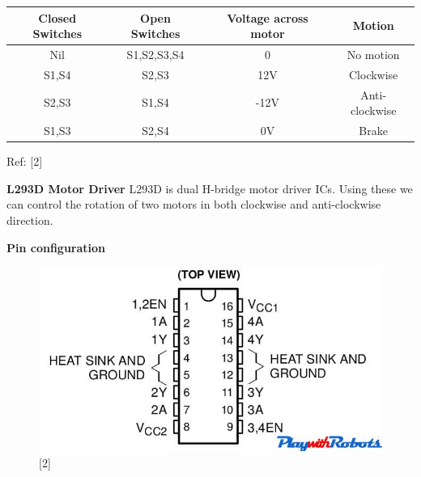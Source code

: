 \documentclass[11pt,a4paper]{article}
\begin{document}
    \begin{tabular}{|c|c|c|c|}
    	\hline
	    Closed Switches & Open Switches & Voltage across motor & Motion\\
	    \hline
		Nil	& S1,S2,S3,S4	& 0 & No motion\\
		\hline
	    S1,S4 &	S2,S3 &	12V & Clockwise \\
	    \hline
	    S2,S3 & S1,S4 & -12V & Anti-clockwise \\
	    \hline
	    S1,S3 & S2,S4 & 0V & Brake\\
	    \hline
    \end{tabular}
    \centering
    Ref: [2]
    
    \newpage
    \flushleft
    \textbf{L293D Motor Driver}
    \vspace{0.3cm}
    \newline
    L293D is dual H-bridge motor driver ICs. Using these we can control the rotation of two motors in both clockwise and anti-clockwise direction.
    
    \vspace{0.3cm}
    \textbf{Pin configuration}
    \begin{figure}[h!]
    	\includegraphics[scale=0.7]{l293d.jpg}
    	\centering
    	\caption{[2]}
    \end{figure}
    
\end{document}
